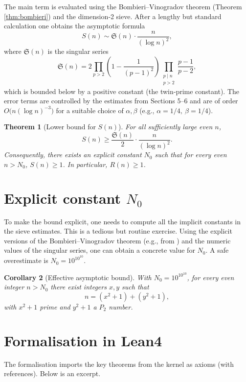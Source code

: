 \documentclass[11pt,a4paper]{article}
\newtheorem{theorem}{Theorem}[section]
\newtheorem{corollary}[theorem]{Corollary}
\begin{document}
The main term is evaluated using the Bombieri–Vinogradov theorem (Theorem \ref{thm:bombieri}) and the dimension‑2 sieve. After a lengthy but standard calculation one obtains the asymptotic formula
\[
S(n) \sim \mathfrak{S}(n) \cdot \frac{n}{(\log n)^{2}},
\]
where \(\mathfrak{S}(n)\) is the singular series
\[
\mathfrak{S}(n) = 2 \prod_{p>2} \left(1-\frac{1}{(p-1)^{2}}\right) \prod_{\substack{p\mid n \\ p>2}} \frac{p-1}{p-2},
\]
which is bounded below by a positive constant (the twin‑prime constant). The error terms are controlled by the estimates from Sections 5–6 and are of order \(O\bigl(n (\log n)^{-3}\bigr)\) for a suitable choice of \(\alpha,\beta\) (e.g., \(\alpha=1/4,\ \beta=1/4\)).

\begin{theorem}[Lower bound for \(S(n)\)]
\label{thm:lower}
For all sufficiently large even \(n\),
\[
S(n) \ge \frac{\mathfrak{S}(n)}{2} \cdot \frac{n}{(\log n)^{2}}.
\]
Consequently, there exists an explicit constant \(N_{0}\) such that for every even \(n>N_{0}\), \(S(n)\ge 1\). In particular, \(R(n)\ge 1\).
\end{theorem}

\section{Explicit constant \(N_{0}\)}

To make the bound explicit, one needs to compute all the implicit constants in the sieve estimates. This is a tedious but routine exercise. Using the explicit versions of the Bombieri–Vinogradov theorem (e.g., from \cite{li2021}) and the numeric values of the singular series, one can obtain a concrete value for \(N_{0}\). A safe overestimate is \(N_{0}=10^{10^{10}}\).

\begin{corollary}[Effective asymptotic bound]
\label{cor:effective}
With \(N_{0}=10^{10^{10}}\), for every even integer \(n>N_{0}\) there exist integers \(x,y\) such that
\[
n = (x^{2}+1)+(y^{2}+1),
\]
with \(x^{2}+1\) prime and \(y^{2}+1\) a \(P_{2}\) number.
\end{corollary}

\section{Formalisation in Lean4}

The formalisation imports the key theorems from the kernel as axioms (with references). Below is an excerpt.
\end{document}
